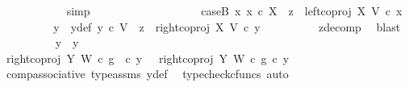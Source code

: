 \begin{isabellebody}
\ \ \ \ \ \ \ \ \ \ \isamarkupfalse%
\ simp\isanewline
\ \ \ \ \ \ \isamarkupfalse%
\isanewline
\ \ \ \ \isamarkupfalse%
\isanewline
\ \ \ \ \ \ \isamarkupfalse%
\ caseB{\isacharcolon}{\kern0pt}\ {\isachardoublequoteopen}{\isasymnexists}x{}{\isachardot}{\kern0pt}\ x{}\ {\isasymin}\isactrlsub c\ X\ {\isasymand}\ z{}\ {\isacharequal}{\kern0pt}\ left{\isacharunderscore}{\kern0pt}coproj\ X\ V\ {\isasymcirc}\isactrlsub c\ x{}{\isachardoublequoteclose}\isanewline
\ \ \ \ \ \ \isamarkupfalse%
\ \isamarkupfalse%
\ y{}\ \ y{}{\isacharunderscore}{\kern0pt}def{\isacharcolon}{\kern0pt}\ {\isachardoublequoteopen}{\isacharparenleft}{\kern0pt}y{}\ {\isasymin}\isactrlsub c\ V\ {\isasymand}\ z{}\ {\isacharequal}{\kern0pt}\ right{\isacharunderscore}{\kern0pt}coproj\ X\ V\ {\isasymcirc}\isactrlsub c\ y{}{\isacharparenright}{\kern0pt}{\isachardoublequoteclose}\isanewline
\ \ \ \ \ \ \ \ \isamarkupfalse%
\ z{}{\isacharunderscore}{\kern0pt}decomp\ \isamarkupfalse%
\ blast\isanewline
\ \ \ \ \ \ \ \ \isamarkupfalse%
\ {\isachardoublequoteopen}y{}\ {\isacharequal}{\kern0pt}\ y{}{\isachardoublequoteclose}\isanewline
\ \ \ \ \ \ \ \ \isamarkupfalse%
\ {\isacharminus}{\kern0pt}\ \isanewline
\ \ \ \ \ \ \ \ \ \ \isamarkupfalse%
\ {\isachardoublequoteopen}right{\isacharunderscore}{\kern0pt}coproj\ Y\ W\ {\isasymcirc}\isactrlsub c\ g\ \ {\isasymcirc}\isactrlsub c\ y{}\ \ {\isacharequal}{\kern0pt}\ {\isacharparenleft}{\kern0pt}right{\isacharunderscore}{\kern0pt}coproj\ Y\ W\ {\isasymcirc}\isactrlsub c\ g{\isacharparenright}{\kern0pt}\ {\isasymcirc}\isactrlsub c\ y{}{\isachardoublequoteclose}\isanewline
\ \ \ \ \ \ \ \ \ \ \ \ \isamarkupfalse%
\ comp{\isacharunderscore}{\kern0pt}associative{}\ type{\isacharunderscore}{\kern0pt}assms{\isacharparenleft}{\kern0pt}{}{\isacharparenright}{\kern0pt}\ y{}{\isacharunderscore}{\kern0pt}def\ \isamarkupfalse%
\ {\isacharparenleft}{\kern0pt}typecheck{\isacharunderscore}{\kern0pt}cfuncs{\isacharcomma}{\kern0pt}\ auto{\isacharparenright}{\kern0pt}\isanewline
\ \ \ \ \ \ \ \ \ \ \isamarkupfalse%
\ \isamarkupfalse%
\ {\isachardoublequoteopen}{\isachardot}{\kern0pt}{\isachardot}{\kern0pt}{\isachardot}{\kern0pt}\ {\isacharequal}{\kern0pt}\isanewline

\end{isabellebody}
